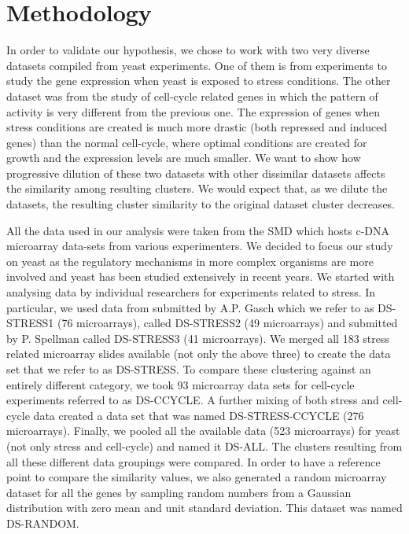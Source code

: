 \section{Methodology}\label{method}
In order to validate our hypothesis, we chose to work with two very diverse datasets compiled from yeast experiments. One of them is from experiments to study the gene expression when yeast is exposed to stress conditions. The other dataset was from the study of cell-cycle related genes in which the pattern of activity is very different from the previous one. The expression of genes when stress conditions are created is much more drastic (both repressed and induced genes) than the normal cell-cycle, where optimal conditions are created for growth and the expression levels are much smaller. We want to show how progressive dilution of these two datasets with other dissimilar datasets affects the similarity among resulting clusters. We would expect that, as we dilute the datasets, the resulting cluster similarity to the original dataset cluster decreases.

All the data used in our analysis were taken from the \ac{SMD} \citep{sherlock01smd} which hosts c-DNA microarray data-sets from various experimenters. We decided to focus our study on yeast as the regulatory mechanisms in more complex organisms are more involved and yeast has been studied extensively in recent years. We started with analysing data by individual researchers for experiments related to stress. In particular, we used data from \citet{gasch00genomicexpn} submitted by A.P. Gasch which we refer to as DS-STRESS1 (76 microarrays), \citet {saldanha04nutritional} called DS-STRESS2 (49 microarrays) and \citet{gasch00genomicexpn} submitted by P. Spellman called DS-STRESS3 (41 microarrays). We merged all 183 stress related microarray slides available (not only the above three) to create the data set that we refer to as DS-STRESS. To compare these clustering against an entirely different category, we took 93 microarray data sets for cell-cycle experiments \citep{spellman98comprehensive} referred to as DS-CCYCLE. A further mixing of both stress and cell-cycle data created a data set that was named DS-STRESS-CCYCLE (276 microarrays). Finally, we pooled all the available data (523 microarrays) for yeast (not only stress and cell-cycle) and named it DS-ALL. The clusters resulting from all these different data groupings were compared. In order to have a reference point to compare the similarity values, we also generated a random microarray dataset for all the genes by sampling random numbers from a Gaussian distribution with zero mean and unit standard deviation. This dataset was named DS-RANDOM.

